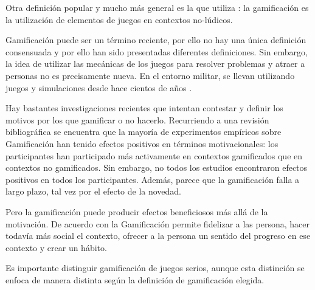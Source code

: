 Otra definición popular y mucho más general es la que utiliza  \cite{kwerb-WhatIs}: la gamificación es la utilización de elementos de juegos en contextos no-lúdicos.



Gamificación puede ser un término reciente, por ello no hay una única definición consensuada y por ello han sido presentadas diferentes definiciones.
%
Sin embargo, la idea de utilizar las mecánicas de los juegos para resolver problemas y atraer a personas no es precisamente nueva. 
%
En el entorno militar, se llevan utilizando juegos y simulaciones desde hace cientos  de años \citep{GamificationDefII}.

%
%



Hay bastantes investigaciones recientes que intentan contestar y definir los motivos por los que gamificar o no hacerlo.
%
Recurriendo a una revisión bibliográfica \cite{EmpiricalGamification} se encuentra que la mayoría de experimentos empíricos sobre Gamificación han tenido efectos positivos en términos motivacionales: los participantes han participado más activamente en contextos gamificados que en contextos no gamificados.
%
Sin embargo, no todos los estudios encontraron efectos positivos en todos los participantes.
%
Además, parece que la gamificación falla a largo plazo, tal vez por el efecto de la novedad. 

Pero la gamificación puede producir efectos beneficiosos más allá de la motivación.
% 
De acuerdo con  \cite{kwerb-WhyGamify} la Gamificación permite fidelizar a las persona, hacer todavía más social el contexto, ofrecer a la persona un sentido del progreso en ese contexto y crear un hábito.





Es importante distinguir gamificación de juegos serios, aunque esta distinción se enfoca de manera distinta según la definición de gamificación elegida.


